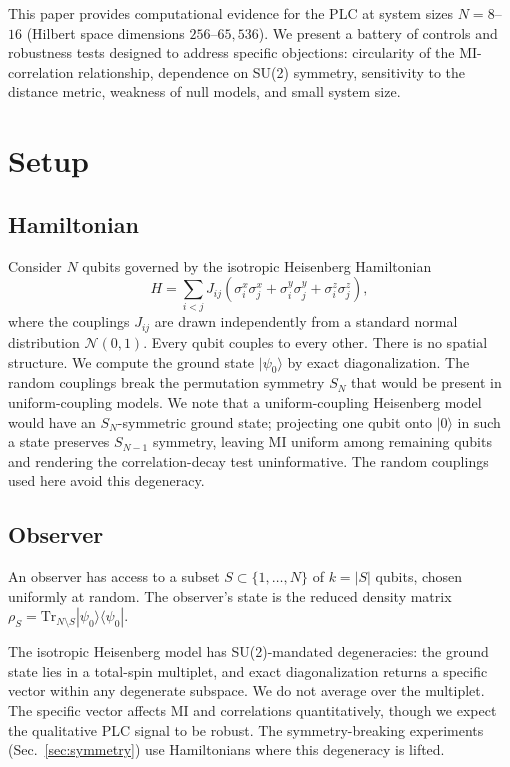 \documentclass[aps,pra,twocolumn,superscriptaddress]{revtex4-2}
\begin{document}
This paper provides computational evidence for the PLC at system sizes $N = 8$--$16$ (Hilbert space dimensions $256$--$65{,}536$). We present a battery of controls and robustness tests designed to address specific objections: circularity of the MI-correlation relationship, dependence on SU(2) symmetry, sensitivity to the distance metric, weakness of null models, and small system size.


\section{Setup}

\subsection{Hamiltonian}

Consider $N$ qubits governed by the isotropic Heisenberg Hamiltonian
\begin{equation}
H = \sum_{i<j} J_{ij} \left(\sigma^x_i \sigma^x_j + \sigma^y_i \sigma^y_j + \sigma^z_i \sigma^z_j\right),
\label{eq:hamiltonian}
\end{equation}
where the couplings $J_{ij}$ are drawn independently from a standard normal distribution $\mathcal{N}(0,1)$. Every qubit couples to every other. There is no spatial structure. We compute the ground state $|\psi_0\rangle$ by exact diagonalization. The random couplings break the permutation symmetry $S_N$ that would be present in uniform-coupling models. We note that a uniform-coupling Heisenberg model would have an $S_N$-symmetric ground state; projecting one qubit onto $|0\rangle$ in such a state preserves $S_{N-1}$ symmetry, leaving MI uniform among remaining qubits and rendering the correlation-decay test uninformative. The random couplings used here avoid this degeneracy.

\subsection{Observer}

An observer has access to a subset $S \subset \{1, \ldots, N\}$ of $k = |S|$ qubits, chosen uniformly at random. The observer's state is the reduced density matrix $\rho_S = \text{Tr}_{N \setminus S}|\psi_0\rangle\langle\psi_0|$.

The isotropic Heisenberg model has SU(2)-mandated degeneracies: the ground state lies in a total-spin multiplet, and exact diagonalization returns a specific vector within any degenerate subspace. We do not average over the multiplet. The specific vector affects MI and correlations quantitatively, though we expect the qualitative PLC signal to be robust. The symmetry-breaking experiments (Sec.~\ref{sec:symmetry}) use Hamiltonians where this degeneracy is lifted.
\end{document}

